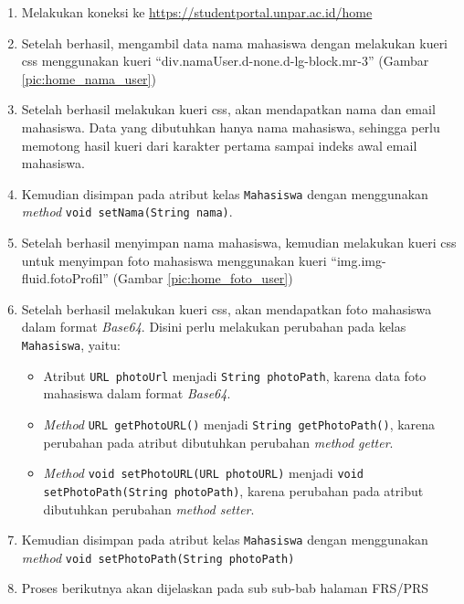 \begin{enumerate}
	\item Melakukan koneksi ke \url{https://studentportal.unpar.ac.id/home}
	\item Setelah berhasil, mengambil data nama mahasiswa dengan melakukan kueri css menggunakan kueri ``div.namaUser.d-none.d-lg-block.mr-3'' (Gambar \ref{pic:home_nama_user})
	\item Setelah berhasil melakukan kueri css, akan mendapatkan nama dan email mahasiswa. Data yang dibutuhkan hanya nama mahasiswa, sehingga perlu memotong hasil kueri dari karakter pertama sampai indeks awal email mahasiswa. 
	\item Kemudian disimpan pada atribut kelas \texttt{Mahasiswa} dengan menggunakan \textit{method} \texttt{void setNama(String nama)}.
	\item Setelah berhasil menyimpan nama mahasiswa, kemudian melakukan kueri css untuk menyimpan foto mahasiswa menggunakan kueri ``img.img-fluid.fotoProfil'' (Gambar \ref{pic:home_foto_user})
	\item Setelah berhasil melakukan kueri css, akan mendapatkan foto mahasiswa dalam format \textit{Base64}. Disini perlu melakukan perubahan pada kelas \texttt{Mahasiswa}, yaitu:
	\begin{itemize}
		\item Atribut \texttt{URL photoUrl} menjadi \texttt{String photoPath}, karena data foto mahasiswa dalam format \textit{Base64}.
		\item \textit{Method} \texttt{URL getPhotoURL()} menjadi \texttt{String getPhotoPath()}, karena perubahan pada atribut dibutuhkan perubahan \textit{method getter}.
		\item \textit{Method} \texttt{void setPhotoURL(URL photoURL)} menjadi \texttt{void setPhotoPath(String photoPath)}, karena perubahan pada atribut dibutuhkan perubahan \textit{method setter}.
	\end{itemize}
	\item Kemudian disimpan pada atribut kelas \texttt{Mahasiswa} dengan menggunakan \textit{method} \texttt{void setPhotoPath(String photoPath)}
	\item Proses berikutnya akan dijelaskan pada sub sub-bab halaman FRS/PRS
\end{enumerate}

